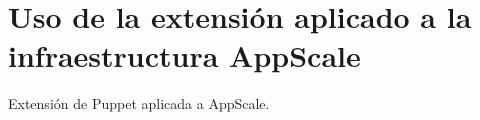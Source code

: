 \chapter{Uso de la extensión aplicado a la infraestructura AppScale}
\label{cap:appscale}

Extensión de Puppet aplicada a AppScale.
